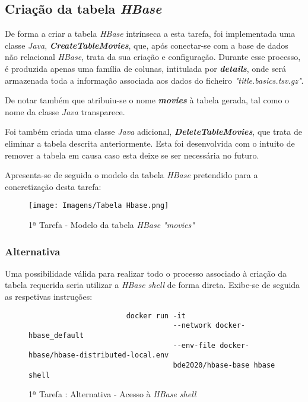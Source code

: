 \documentclass[a4paper]{report}
\begin{document}
{		\subsection{Criação da tabela \textit{HBase}} \label{subsec:Task1-1}
		De forma a criar a tabela \textit{HBase} intrínseca a esta tarefa, foi implementada uma classe \textit{Java}, \textbf{\textit{CreateTableMovies}}, que, após conectar-se com a base de dados não relacional \textit{HBase}, trata da sua criação e configuração.
		Durante esse processo, é produzida apenas uma família de colunas, intitulada por \textbf{\textit{details}}, onde será armazenada toda a informação associada aos dados do ficheiro \textit{"title.basics.tsv.gz"}.

		De notar também que atribuiu-se o nome \textbf{\textit{movies}} à tabela gerada, tal como o nome da classe \textit{Java} transparece.

		Foi também criada uma classe \textit{Java} adicional, \textbf{\textit{DeleteTableMovies}}, que trata de eliminar a tabela descrita anteriormente.
		Esta foi desenvolvida com o intuito de remover a tabela em causa caso esta deixe se ser necessária no futuro.
        
        Apresenta-se de seguida o modelo da tabela \textit{HBase} pretendido para a concretização desta tarefa:
        \begin{figure}[H]
            \centering
            \texttt{[image: Imagens/Tabela Hbase.png]}
            \caption{1ª Tarefa - Modelo da tabela \textit{HBase "movies"}}
            \label{fig:5}
        \end{figure}

			\subsubsection{Alternativa}
			Uma possibilidade válida para realizar todo o processo associado à criação da tabela requerida seria utilizar a \textit{HBase shell} de forma direta.
			Exibe-se de seguida as respetivas instruções:
			\begin{figure}[H]
				{
					\color{teal}
					\begin{verbatim}
					   docker run -it
					              --network docker-hbase_default
					              --env-file docker-hbase/hbase-distributed-local.env
					              bde2020/hbase-base hbase shell
					\end{verbatim}
				}
				\caption{1ª Tarefa : Alternativa - Acesso à \textit{HBase shell}}
				\label{fig:6}
			\end{figure}

}
\end{document}
